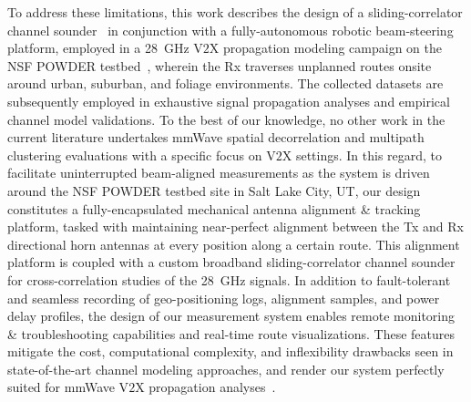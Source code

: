 \documentclass[12pt, draftcls, onecolumn]{IEEEtran}
\begin{document}
To address these limitations, this work describes the design of a sliding-correlator channel sounder~\cite{Sounder} in conjunction with a fully-autonomous robotic beam-steering platform, employed in a \SI{28}{\giga\hertz} V$2$X propagation modeling campaign on the NSF POWDER testbed~\cite{POWDER, POWDER_RF}, wherein the Rx traverses unplanned routes onsite around urban, suburban, and foliage environments. The collected datasets are subsequently employed in exhaustive signal propagation analyses and empirical channel model validations. To the best of our knowledge, no other work in the current literature undertakes mmWave spatial decorrelation and multipath clustering evaluations with a specific focus on V$2$X settings. In this regard, to facilitate uninterrupted beam-aligned measurements as the system is driven around the NSF POWDER testbed site in Salt Lake City, UT, our design constitutes a fully-encapsulated mechanical antenna alignment \& tracking platform, tasked with maintaining near-perfect alignment between the Tx and Rx directional horn antennas at every position along a certain route. This alignment platform is coupled with a custom broadband sliding-correlator channel sounder for cross-correlation studies of the \SI{28}{\giga\hertz} signals. In addition to fault-tolerant and seamless recording of geo-positioning logs, alignment samples, and power delay profiles, the design of our measurement system enables remote monitoring \& troubleshooting capabilities and real-time route visualizations. These features mitigate the cost, computational complexity, and inflexibility drawbacks seen in state-of-the-art channel modeling approaches, and render our system perfectly suited for mmWave V$2$X propagation analyses~\cite{SPAVE_ICC}.
\end{document}

